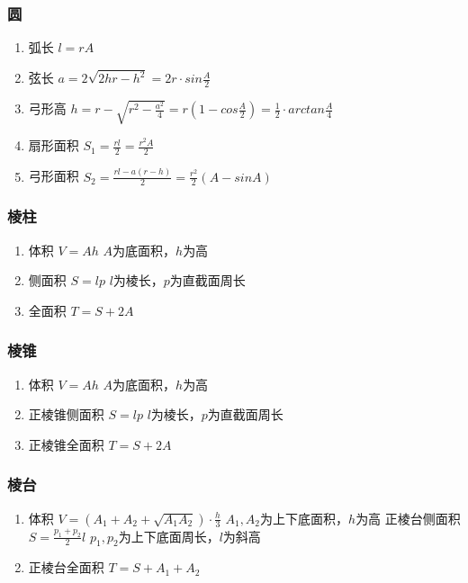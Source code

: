 \documentclass[landscape,twocolumn,a4paper]{article}
\begin{document}
	\subsubsection*{圆}

	\begin{enumerate}
		\item 弧长
		$l=rA$
		\item 弦长
		$a=2\sqrt{2hr-h^2}=2r\cdot sin\frac{A}{2}$
		\item 弓形高
		$h=r-\sqrt{r^2-\frac{a^2}{4}}=r(1-cos\frac{A}{2})=\frac{1}{2} \cdot arctan\frac{A}{4}$
		\item 扇形面积
		$S_1=\frac{rl}{2}=\frac{r^2A}{2}$
		\item 弓形面积
		$S_2=\frac{rl-a(r-h)}{2}=\frac{r^2}{2}(A-sinA)$
	\end{enumerate}

	\subsubsection*{棱柱}

	\begin{enumerate}
		\item 体积
		$V=Ah$
		$A$为底面积，$h$为高
		\item 侧面积
		$S=lp$
		$l$为棱长，$p$为直截面周长
		\item 全面积
		$T=S+2A$
	\end{enumerate}

	\subsubsection*{棱锥}

	\begin{enumerate}
		\item 体积
		$V=Ah$
		$A$为底面积，$h$为高
		\item 正棱锥侧面积
		$S=lp$
		$l$为棱长，$p$为直截面周长
		\item 正棱锥全面积
		$T=S+2A$
	\end{enumerate}

	\subsubsection*{棱台}

	\begin{enumerate}
		\item 体积
		$V=(A_1+A_2+\sqrt{A_1A_2}) \cdot \frac{h}{3}$
		$A_1,A_2$为上下底面积，$h$为高    正棱台侧面积
		$S=\frac{p_1+p_2}{2}l$
		$p_1,p_2$为上下底面周长，$l$为斜高
		\item 正棱台全面积
		$T=S+A_1+A_2$
	\end{enumerate}
\end{document}
